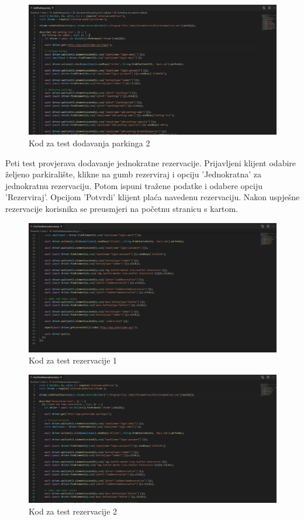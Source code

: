 \begin{figure}[H]
	\includegraphics[width=1\linewidth]{images/AddParking2.png}
	\caption{Kod za test dodavanja parkinga 2}
	\label{fig:AddParking test - kod 2} 
\end{figure}

			Peti test provjerava dodavanje jednokratne rezervacije. Prijavljeni klijent odabire željeno parkiralište, klikne na gumb rezerviraj i opciju 'Jednokratna' za jednokratnu rezervaciju. Potom ispuni tražene podatke i odabere opciju 'Rezerviraj'. Opcijom 'Potvrdi' klijent plaća navedenu rezervaciju. Nakon uspješne rezervacije korisnika se preusmjeri na početnu stranicu s kartom.

\begin{figure}[H]
	\includegraphics[width=1\linewidth]{images/OneTimeReservation1.png}
	\caption{Kod za test rezervacije 1}
	\label{fig:OneTimeReservation test - kod1} 
\end{figure}

\begin{figure}[H]
	\includegraphics[width=1\linewidth]{images/OneTimeReservation2.png}
	\caption{Kod za test rezervacije 2}
	\label{fig:OneTimeReservation test - kod2} 
\end{figure}
			
